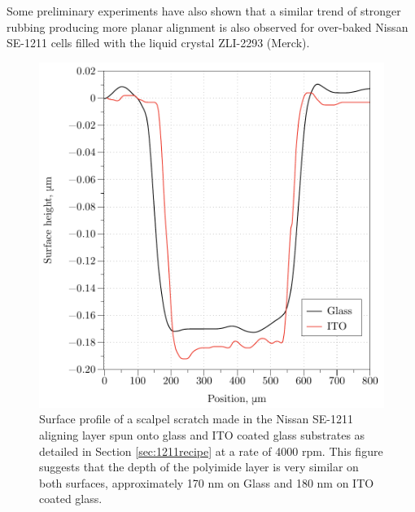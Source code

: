 Some preliminary experiments have also shown that a similar trend of stronger rubbing producing more planar alignment is also observed for over-baked Nissan SE-1211 cells filled with the liquid crystal ZLI-2293 (Merck).



\begin{figure}
\begin{center}
\includegraphics{Figures/Pretilt/scratch}
\end{center}
\caption[Surface profile of scratched aligning layers]{\label{fig:scratch}{Surface profile of a scalpel scratch made in the Nissan SE-1211 aligning layer spun onto glass and ITO coated glass substrates as detailed in Section \ref{sec:1211recipe} at a rate of 4000 rpm. This figure suggests that the depth of the polyimide layer is very similar on both surfaces, approximately 170 nm on Glass and 180 nm on ITO coated glass.}}
\end{figure}

